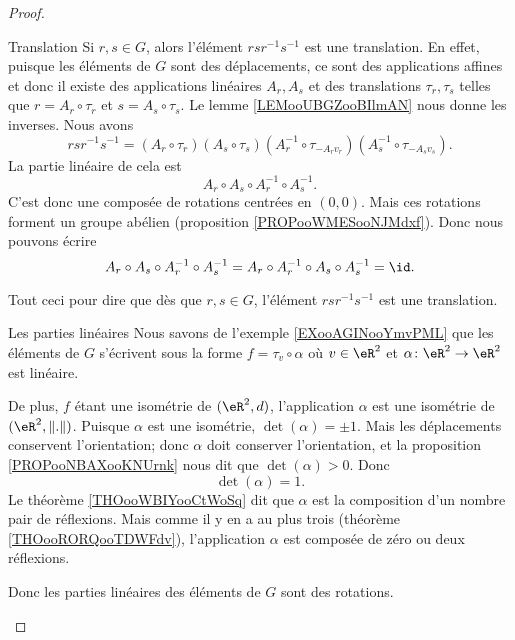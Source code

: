 \begin{proof}
\begin{subproof}
		\item[Translation]
		Si \( r,s\in G\), alors l'élément \( rsr^{-1}s^{-1}\) est une translation. En effet, puisque les éléments de \( G\) sont des déplacements, ce sont des applications affines et donc il existe des applications linéaires \( A_r,A_s\) et des translations \( \tau_r,\tau_s\) telles que \( r=A_r\circ \tau_r\) et \( s=A_s\circ \tau_s\). Le lemme \ref{LEMooUBGZooBIlmAN} nous donne les inverses. Nous avons
		\begin{equation}
			rsr^{-1}s^{-1}=(A_r\circ \tau_r)(A_s\circ \tau_s)(A_r^{-1}\circ \tau_{-A_rv_r})(A_s^{-1}\circ \tau_{-A_sv_s}).
		\end{equation}
		La partie linéaire de cela est
		\begin{equation}
			A_r\circ A_s\circ A_r^{-1}\circ A_s^{-1}.
		\end{equation}
		C'est donc une composée de rotations centrées en \( (0,0)\). Mais ces rotations forment un groupe abélien (proposition \ref{PROPooWMESooNJMdxf}). Donc nous pouvons écrire
		\begin{equation}
			A_r\circ A_s\circ A_r^{-1}\circ A_s^{-1}=A_r\circ A_r^{-1}\circ A_s\circ A_s^{-1}=\id.
		\end{equation}

		Tout ceci pour dire que dès que \( r,s\in G\), l'élément \( rsr^{-1} s^{-1}\) est une translation.

		\item[Les parties linéaires\cite{MonCerveau}]
		Nous savons de l'exemple \ref{EXooAGINooYmvPML} que les éléments de \( G\) s'écrivent sous la forme \( f=\tau_v\circ \alpha\) où \( v\in \eR^2\) et \( \alpha\colon \eR^2\to \eR^2\) est linéaire.

		De plus, \( f\) étant une isométrie de \( (\eR^2,d)\), l'application \( \alpha\) est une isométrie de \( (\eR^2,\| . \|)\). Puisque \( \alpha\) est une isométrie, \( \det(\alpha)=\pm1\). Mais les déplacements conservent l'orientation; donc \( \alpha\) doit conserver l'orientation, et la proposition \ref{PROPooNBAXooKNUrnk} nous dit que \( \det(\alpha)>0\). Donc
		\begin{equation}
			\det(\alpha)=1.
		\end{equation}
		Le théorème \ref{THOooWBIYooCtWoSq} dit que \( \alpha\) est la composition d'un nombre pair de réflexions. Mais comme il y en a au plus trois (théorème \ref{THOooRORQooTDWFdv}), l'application \( \alpha\) est composée de zéro ou deux réflexions.

		Donc les parties linéaires des éléments de \( G\) sont des rotations.


\end{subproof}
\end{proof}
